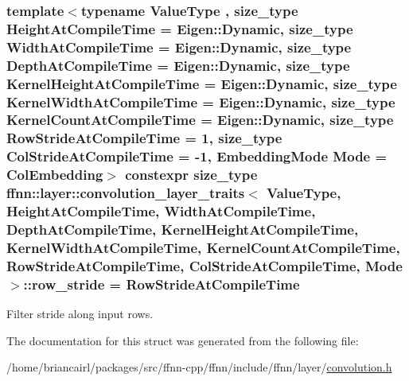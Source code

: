 \hypertarget{structffnn_1_1layer_1_1convolution__layer__traits_a6b62abb46818fb4d09b096e53089b4f4}{
\subsubsection[{row\-\_\-stride}]{\setlength{\rightskip}{0pt plus 5cm}template$<$typename Value\-Type , size\-\_\-type Height\-At\-Compile\-Time = Eigen\-::\-Dynamic, size\-\_\-type Width\-At\-Compile\-Time = Eigen\-::\-Dynamic, size\-\_\-type Depth\-At\-Compile\-Time = Eigen\-::\-Dynamic, size\-\_\-type Kernel\-Height\-At\-Compile\-Time = Eigen\-::\-Dynamic, size\-\_\-type Kernel\-Width\-At\-Compile\-Time = Eigen\-::\-Dynamic, size\-\_\-type Kernel\-Count\-At\-Compile\-Time = Eigen\-::\-Dynamic, size\-\_\-type Row\-Stride\-At\-Compile\-Time = 1, size\-\_\-type Col\-Stride\-At\-Compile\-Time = -\/1, Embedding\-Mode Mode = Col\-Embedding$>$ constexpr {\bf size\-\_\-type} {\bf ffnn\-::layer\-::convolution\-\_\-layer\-\_\-traits}$<$ Value\-Type, Height\-At\-Compile\-Time, Width\-At\-Compile\-Time, Depth\-At\-Compile\-Time, Kernel\-Height\-At\-Compile\-Time, Kernel\-Width\-At\-Compile\-Time, Kernel\-Count\-At\-Compile\-Time, Row\-Stride\-At\-Compile\-Time, Col\-Stride\-At\-Compile\-Time, Mode $>$\-::row\-\_\-stride = Row\-Stride\-At\-Compile\-Time\hspace{0.3cm}{\ttfamily [static]}}}\label{structffnn_1_1layer_1_1convolution__layer__traits_a6b62abb46818fb4d09b096e53089b4f4}


Filter stride along input rows. 



The documentation for this struct was generated from the following file\-:\begin{DoxyCompactItemize}
\item 
/home/briancairl/packages/src/ffnn-\/cpp/ffnn/include/ffnn/layer/\hyperlink{convolution_8h}{convolution.\-h}\end{DoxyCompactItemize}
